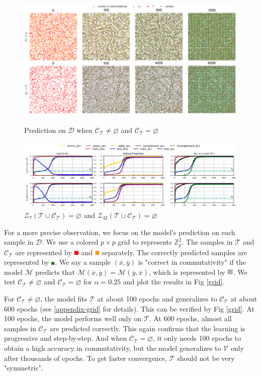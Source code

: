 \documentclass{article}
\newcommand\ColorSquare[2]{{\color[RGB]{#1}\rule{#2}{#2}}}
\begin{document}
\begin{itemize}
    \begin{figure}[htbp]
      \centering
      \includegraphics[width=\textwidth]{./pic/grid.png}
      \caption{Prediction on $\mathcal{D}$ when $\mathcal{C_T} \neq \varnothing$ and $\mathcal{C_T} = \varnothing$}
      \label{grid}
      \includegraphics[width=\textwidth]{./pic/noq.png}
      \caption{$\mathcal{Z}_7(\mathcal{T}\cup\mathcal{C_T}) = \varnothing$ and $\mathcal{Z}_{42}(\mathcal{T}\cup\mathcal{C_T}) = \varnothing$}
      \label{noq}
    \end{figure}
    For a more precise observation, we focus on the model's prediction on each sample in $\mathcal{D}$. We use a colored $p\times p$ grid to represents $\mathbb{Z}_p^2$. The samples in $\mathcal{T}$ and $\mathcal{C_T}$ are represented by $\ColorSquare{251, 0, 6}{2mm}$ and $\ColorSquare{254, 148, 6}{2mm}$ separately. The correctly predicted samples are represented by $\ColorSquare{17, 112, 0}{1.5mm}$. We say a sample $(\overline{x}, \overline{y})$ is "correct in commutativity" if the model $\mathcal{M}$ predicts that $\mathcal{M}(\overline{x}, \overline{y}) = \mathcal{M}(\overline{y}, \overline{x})$, which is represented by $\ColorSquare{179, 179, 179}{2.5mm}$. We test $\mathcal{C_T} \neq \varnothing$ and $\mathcal{C_T} = \varnothing$ for $\alpha=0.25$ and plot the results in Fig \ref{grid}.

    For $\mathcal{C_T} \neq \varnothing$, the model fits $\mathcal{T}$ at about 100 epochs and generalizes to $\mathcal{C_T}$ at about 600 epochs (see \ref{appendix-grid} for details). This can be verified by Fig \ref{grid}. At 100 epochs, the model performs well only on $\mathcal{T}$. At 600 epochs, almost all samples in $\mathcal{C_T}$ are predicted correctly. This again confirms that the learning is progressive and step-by-step. And when $\mathcal{C_T} = \varnothing$, it only needs 100 epochs to obtain a high accuracy in commutativity, but the model generalizes to $\mathcal{V}$ only after thousands of epochs. To get faster convergence, $\mathcal{T}$ should not be very "symmetric".
    

\end{itemize}
\end{document}
